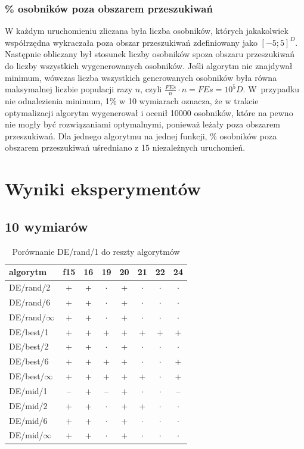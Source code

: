 \documentclass[a4paper,onecolumn,oneside,11pt,wide,floatssmall]{mwrep}
\theoremstyle{definition}
\theoremstyle{plain}%
\theoremstyle{remark}
\begin{document}
\subsection{\% osobników poza obszarem przeszukiwań}

W każdym uruchomieniu zliczana była liczba osobników, których jakakolwiek współrzędna wykraczała poza
obszar przeszukiwań zdefiniowany jako $[-5; 5]^D$. Następnie obliczany był stosunek liczby 
osobników spoza obszaru przeszukiwań do liczby wszystkich wygenerowanych osobników. Jeśli algorytm
nie znajdywał minimum, wówczas liczba wszystkich generowanych osobników była równa maksymalnej liczbie
populacji razy $n$, czyli $\frac{FEs}{n} \cdot n = FEs = 10^5D$. W~przypadku nie odnalezienia minimum, 
1\% w 10 wymiarach oznacza, że 
w trakcie optymalizacji algorytm wygenerował i ocenił 10000 osobników, 
które na pewno nie mogły być rozwiązaniami optymalnymi,
ponieważ leżały poza obszarem przeszukiwań. Dla jednego algorytmu na jednej funkcji, \% osobników
poza obszarem przeszukiwań uśredniano z 15 niezależnych uruchomień.

\chapter{Wyniki eksperymentów}

\section{10 wymiarów}

\begin{table}[H]
\centering
\begin{tabular}{ l | c | c | c | c | c | c | c }
algorytm         &f15& 16& 19& 20& 21& 22& 24 \\ \hline
DE/rand/2	 & + & + & $\cdot$ & + & $\cdot$ & $\cdot$ & $\cdot$ \\
DE/rand/6	 & + & + & $\cdot$ & + & $\cdot$ & $\cdot$ & $\cdot$ \\
DE/rand/$\infty$	 & + & + & $\cdot$ & + & $\cdot$ & $\cdot$ & $\cdot$ \\
DE/best/1	 & + & + & + & + & + & + & + \\
DE/best/2	 & + & + & $\cdot$ & + & $\cdot$ & $\cdot$ & $\cdot$ \\
DE/best/6	 & + & + & + & + & $\cdot$ & $\cdot$ & + \\
DE/best/$\infty$	 & + & + & + & + & + & $\cdot$ & + \\
DE/mid/1	 & -- & + & -- & + & $\cdot$ & $\cdot$ & -- \\
DE/mid/2	 & + & + & $\cdot$ & + & + & $\cdot$ & $\cdot$ \\
DE/mid/6	 & + & + & $\cdot$ & + & $\cdot$ & $\cdot$ & $\cdot$ \\
DE/mid/$\infty$	 & + & + & $\cdot$ & + & $\cdot$ & $\cdot$ & $\cdot$ \\
\end{tabular}
\caption{Porównanie DE/rand/1 do reszty algorytmów}
\end{table}
\end{document}
